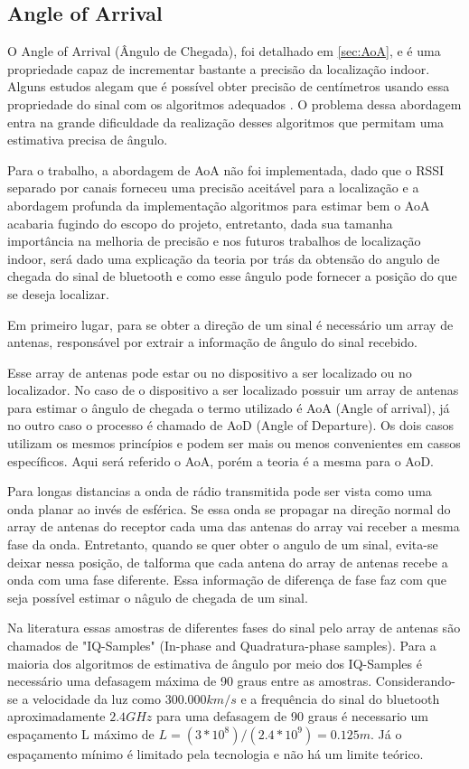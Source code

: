 \subsection{Angle of Arrival}
O Angle of Arrival (Ângulo de Chegada), foi detalhado em \ref{sec:AoA}, e é uma propriedade capaz de incrementar bastante a precisão da localização indoor. Alguns estudos alegam que é possível obter precisão de centímetros usando essa propriedade do sinal com os algoritmos adequados \cite{art9}. O problema dessa abordagem entra na grande dificuldade da realização desses algoritmos que permitam uma estimativa precisa de ângulo. 

Para o trabalho, a abordagem de AoA não foi implementada, dado que o RSSI separado por canais forneceu uma precisão aceitável para a localização e a abordagem profunda da implementação algoritmos para estimar bem o AoA acabaria fugindo do escopo do projeto, entretanto, dada sua tamanha importância na melhoria de precisão e nos futuros trabalhos de localização indoor, será dado uma explicação da teoria por trás da obtensão do angulo de chegada do sinal de bluetooth e como esse ângulo pode fornecer a posição do que se deseja localizar.


Em primeiro lugar, para se obter a direção de um sinal é necessário um array de antenas, responsável por extrair a informação de ângulo do sinal recebido. 

Esse array de antenas pode estar ou no dispositivo a ser localizado ou no localizador. No caso de o dispositivo a ser localizado possuir um array de antenas para estimar o ângulo de chegada o termo utilizado é AoA (Angle of arrival), já no outro caso o processo é chamado de AoD (Angle of Departure). Os dois casos utilizam os mesmos princípios e podem ser mais ou menos convenientes em cassos específicos. \cite{techreport1}
Aqui será referido o AoA, porém a teoria é a mesma para o AoD.

Para longas distancias a onda de rádio transmitida pode ser vista como uma onda planar ao invés de esférica. Se essa onda se propagar na direção normal do array de antenas do receptor cada uma das antenas do array vai receber a mesma fase da onda. Entretanto, quando se quer obter o angulo de um sinal, evita-se deixar nessa posição, de talforma que cada antena do array de antenas recebe a onda com uma fase diferente. Essa informação de diferença de fase faz com que seja possível estimar o nâgulo de chegada de um sinal.

Na literatura essas amostras de diferentes fases do sinal pelo array de antenas são chamados de "IQ-Samples" (In-phase and Quadratura-phase samples). Para a maioria dos algoritmos de estimativa de ângulo por meio dos IQ-Samples é necessário uma defasagem máxima de 90 graus entre as amostras. Considerando-se a velocidade da luz como \( 300.000 km/s \) e a frequência do sinal do bluetooth aproximadamente \( 2.4 GHz \) para uma defasagem de 90 graus é necessario um espaçamento L máximo de \( L = (3 * 10^8)/(2.4 * 10^9) = 0.125m \). Já o espaçamento mínimo é limitado pela tecnologia e não há um limite teórico.

